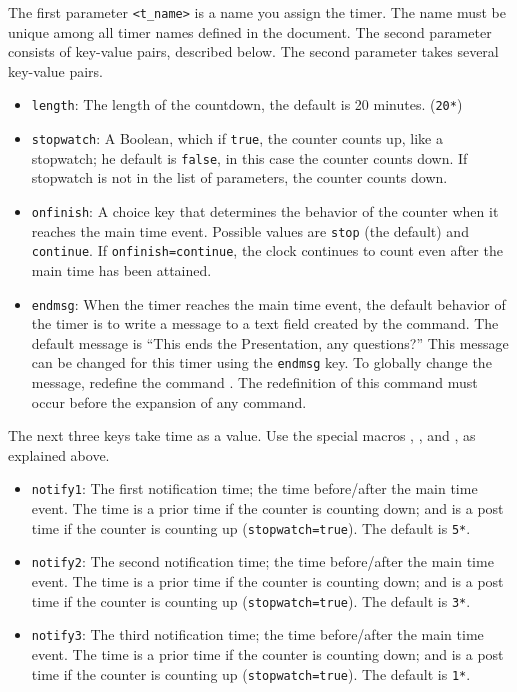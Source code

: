 \documentclass{article}
\begin{document}
\PD The first parameter \texttt{<t\_name>} is a name you assign the timer. The
name must be unique among all timer names defined in the document. The
second parameter consists of key-value pairs, described below.
\KVP The second parameter takes several key-value pairs.
\begin{itemize}
    \item \texttt{length}: The length of the countdown, the default is 20
          minutes. (\texttt{20*})
    \item \texttt{stopwatch}: A Boolean, which if \texttt{true}, the counter counts up, like
          a stopwatch; he default is \texttt{false}, in this case the
          counter counts down. If stopwatch is not in the list of
          parameters, the counter counts down.
    \item \texttt{onfinish}: A choice key that determines the behavior of
          the counter when it reaches the main time event. Possible values
          are \texttt{stop} (the default) and \texttt{continue}. If
          \texttt{onfinish=continue}, the clock continues to count even
          after the main time has been attained.
    \item \texttt{endmsg}: When the timer reaches the main time event,
        the default behavior of the timer is to write a message to a
        text field created by the  command. The
        default message is ``This ends the Presentation, any
        questions?'' This message can be changed for this timer using
        the \texttt{endmsg} key. To globally change the message,
        redefine the command . The
        redefinition of this command must occur before the expansion
        of any  command.
\end{itemize}
The next three keys take time as a value. Use the special macros
, , and , as explained above.
\begin{itemize}
    \item \texttt{notify1}: The first notification time; the time
        before/after the main time event. The time is a prior time if
        the counter is counting down; and is a post time if the
        counter is counting up (\texttt{stopwatch=true}). The default is
        \texttt{5*}.
    \item \texttt{notify2}: The second notification time; the time
        before/after the main time event. The time is a prior time if
        the counter is counting down; and is a post time if the
        counter is counting up (\texttt{stopwatch=true}). The default is
        \texttt{3*}.
    \item \texttt{notify3}: The third notification time; the time
        before/after the main time event. The time is a prior time if
        the counter is counting down; and is a post time if the
        counter is counting up (\texttt{stopwatch=true}). The default is
        \texttt{1*}.
\end{itemize}
\end{document}
